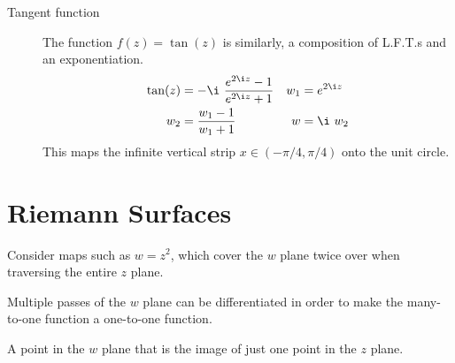 \begin{description}
    \item[Tangent function] The function $ f(z) = \tan(z) $ is similarly, a
        composition of L.F.T.s and an exponentiation.
        \begin{align}
            \tan(z) & = -\i\ \frac{e^{2\i z} - 1}{e^{2\i z} + 1} &
            w_1     & = e^{2\i z}                                  \\
            w_2     & = \frac{w_1 - 1}{w_1 + 1}                  &
            w       & = \i\ w_2
        \end{align}
        This maps the infinite vertical strip $ x \in (-\pi/4, \pi/4) $ onto the
        unit circle.

\end{description}

\section{Riemann Surfaces}

\begin{description}
    \item[Utility] Consider maps such as $ w = z^2 $, which cover the $ w $ plane
        twice over when traversing the entire $ z $ plane. \par
        Multiple passes of the $ w $ plane can be differentiated in order to make the
        many-to-one function a one-to-one function.

    \item[Branch point] A point in the $ w $ plane that is the image of just one
        point in the $ z $ plane.

    \item
\end{description}
